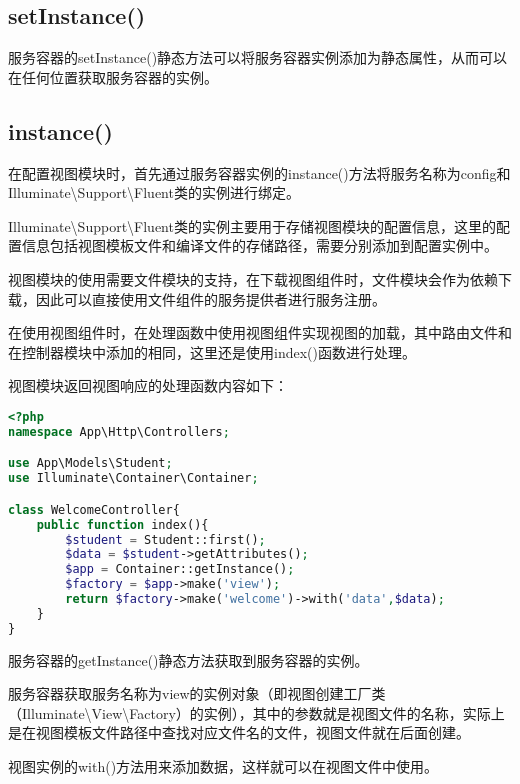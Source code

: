\subsection{setInstance()}

服务容器的setInstance()静态方法可以将服务容器实例添加为静态属性，从而可以在任何位置获取服务容器的实例。

\subsection{instance()}

在配置视图模块时，首先通过服务容器实例的instance()方法将服务名称为config和Illuminate\textbackslash Support\textbackslash Fluent类的实例进行绑定。


Illuminate\textbackslash Support\textbackslash Fluent类的实例主要用于存储视图模块的配置信息，这里的配置信息包括视图模板文件和编译文件的存储路径，需要分别添加到配置实例中。


视图模块的使用需要文件模块的支持，在下载视图组件时，文件模块会作为依赖下载，因此可以直接使用文件组件的服务提供者进行服务注册。

在使用视图组件时，在处理函数中使用视图组件实现视图的加载，其中路由文件和在控制器模块中添加的相同，这里还是使用index()函数进行处理。

视图模块返回视图响应的处理函数内容如下：



\begin{lstlisting}[language=PHP]
<?php
namespace App\Http\Controllers;

use App\Models\Student;
use Illuminate\Container\Container;

class WelcomeController{
    public function index(){
        $student = Student::first();
        $data = $student->getAttributes();
        $app = Container::getInstance();
        $factory = $app->make('view');
        return $factory->make('welcome')->with('data',$data);
    }
}
\end{lstlisting}


\begin{compactitem}
\item 服务容器的getInstance()静态方法获取到服务容器的实例。
\item 服务容器获取服务名称为view的实例对象（即视图创建工厂类（Illuminate\textbackslash View\textbackslash Factory）的实例），其中的参数就是视图文件的名称，实际上是在视图模板文件路径中查找对应文件名的文件，视图文件就在后面创建。
\item 视图实例的with()方法用来添加数据，这样就可以在视图文件中使用。
\end{compactitem}

